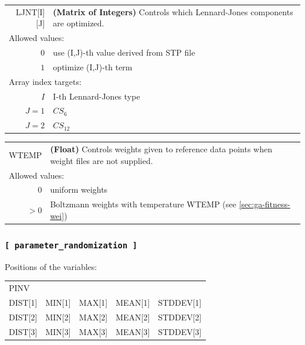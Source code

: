 \documentclass[10pt,a4paper,openany]{memoir}
\numberwithin{equation}{section}
\begin{document}
{
\begin{tabular}{r@{ : }l}
\label{descr:ljnt}
      LJNT[I][J]&\textbf{(Matrix of Integers)} Controls which Lennard-Jones components are optimized.                                               \\ 
\multicolumn{2}{l}{Allowed values:} \\ 
     \(0\)&use (I,J)-th value derived from STP file                                                                         \\ 
     \(1\)&optimize (I,J)-th term                                                                                   \\ 
\multicolumn{2}{l}{Array index targets:} \\ 
     \(I\)& I-th Lennard-Jones type                                                                    \\ 
     \(J=1\)&$CS_6$                                                                                 \\ 
     \(J=2\)&$CS_{12}$                                                                            \\ 
\end{tabular}
\vspace{1ex}
}

{
\begin{tabular}{r@{ : }l}
\label{descr:wtemp}
     WTEMP&\textbf{(Float)} Controls weights given to reference data points when weight files are not supplied. \\ 
\multicolumn{2}{l}{Allowed values:} \\ 
     \(0\)&uniform weights                                                                                      \\ 
    \(>0\)&Boltzmann weights with temperature WTEMP (see \autoref{sec:ga-fitness-wei})                                                            \\ 
\end{tabular}
\vspace{1ex}
}

\subsubsection{\texttt{[~parameter\_randomization~]}}
\label{sec:inp-parameter_randomization}

Positions of the variables:
\begin{center}
  \begin{tabular}{lllll}
    PINV&&&& \\
    DIST[1]&MIN[1]&MAX[1]&MEAN[1]&STDDEV[1] \\
    DIST[2]&MIN[2]&MAX[2]&MEAN[2]&STDDEV[2] \\
    DIST[3]&MIN[3]&MAX[3]&MEAN[3]&STDDEV[3] \\
  \end{tabular}
\end{center}
\end{document}
